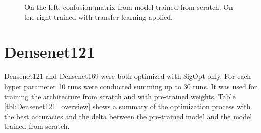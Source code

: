 \begin{figure}[!h]
\centering
\caption{On the left: confusion matrix from model trained from scratch. On the right trained with transfer learning applied.}
\label{fig:resnet18-cm}
\end{figure}

\quad












\section{Densenet121}

Densenet121 and Densenet169 were both optimized with SigOpt only. For each hyper parameter 10 runs were conducted summing up to 30 runs. It was used for training the architecture from scratch and with pre-trained weights. Table \ref{tbl:Densenet121_overview} shows a summary of the optimization process with the best accuracies and the delta between the pre-trained model and the model trained from scratch.\\


